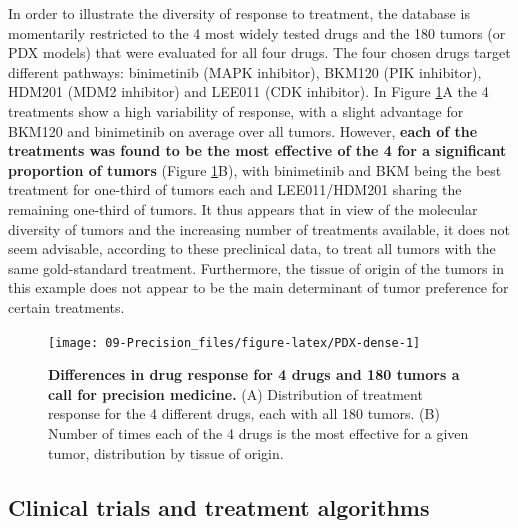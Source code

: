 \documentclass[a4paper,12pt,twoside,onecolumn,openright,final,oldfontcommands]{memoir}
\begin{document}
In order to illustrate the diversity of response to treatment, the
database is momentarily restricted to the 4 most widely tested drugs and
the 180 tumors (or PDX models) that were evaluated for all four drugs.
The four chosen drugs target different pathways: binimetinib (MAPK
inhibitor), BKM120 (PIK inhibitor), HDM201 (MDM2 inhibitor) and LEE011
(CDK inhibitor). In Figure \ref{fig:PDX-dense}A the 4 treatments show a
high variability of response, with a slight advantage for BKM120 and
binimetinib on average over all tumors. However, \textbf{each of the
treatments was found to be the most effective of the 4 for a significant
proportion of tumors} (Figure \ref{fig:PDX-dense}B), with binimetinib
and BKM being the best treatment for one-third of tumors each and
LEE011/HDM201 sharing the remaining one-third of tumors. It thus appears
that in view of the molecular diversity of tumors and the increasing
number of treatments available, it does not seem advisable, according to
these preclinical data, to treat all tumors with the same gold-standard
treatment. Furthermore, the tissue of origin of the tumors in this
example does not appear to be the main determinant of tumor preference
for certain treatments.

\begin{figure}

{\centering \texttt{[image: 09-Precision\_files/figure-latex/PDX-dense-1]} 

}

\caption[Differences in drug response for 4 drugs and 180 tumors a call for precision medicine]{\textbf{Differences in drug response for 4 drugs
and 180 tumors a call for precision medicine.} (A) Distribution of
treatment response for the 4 different drugs, each with all 180 tumors.
(B) Number of times each of the 4 drugs is the most effective for a
given tumor, distribution by tissue of origin.}\label{fig:PDX-dense}
\end{figure}







\subsection{Clinical trials and treatment
algorithms}\label{clinical-trials-and-treatment-algorithms}
\end{document}
